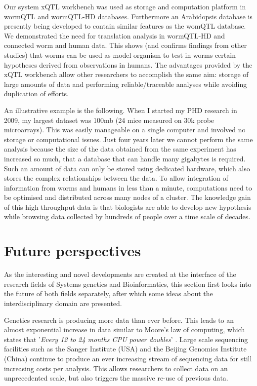 Our system xQTL workbench was used as storage and computation platform in wormQTL and wormQTL-HD databases. Furthermore an Arabidopsis database is 
presently being developed to contain similar features as the womQTL database. We demonstrated the need for translation analysis in wormQTL-HD and 
connected worm and human data. This shows (and confirms findings from other studies) that worms can be used as model organism to test in worms certain 
hypotheses derived from observations in humans. The advantages provided by the xQTL workbench allow other researchers to accomplish the same aim: 
storage of large amounts of data and performing reliable/traceable analyses while avoiding duplication of efforts.

An illustrative example is the following. When I started my PHD research in 2009, my largest dataset was 100mb (24 mice measured on 30k probe 
microarrays). This was easily manageable on a single computer and involved no storage or computational issues. Just four years later we cannot 
perform the same analysis because the size of the data obtained from the same experiment has increased so much, that a database that can handle 
many gigabytes is required. Such an amount of data can only be stored using dedicated hardware, which also stores the complex relationships 
between the data. To allow integration of information from worms and humans in less than a minute, computations need to be optimised and 
distributed across many nodes of a cluster. The knowledge gain of this high throughput data is that biologists are able to develop new 
hypothesis while browsing data collected by hundreds of people over a time scale of decades. 

\section{Future perspectives}
As the interesting and novel developments are created at the interface of the research fields of Systems genetics and Bioinformatics, this 
section first looks into the future of both fields separately, after which some ideas about the interdisciplinary domain are presented.  

Genetics research is producing more data than ever before. This leads to an almost exponential increase in data similar to Moore's law of 
computing, which states that '\emph{Every 12 to 24 months CPU power doubles}' \cite{Moore:1975, Moore:1998, Editorial:2009}. Large scale sequencing facilities such as the Sanger Institute (USA) and 
the Beijing Genomics Institute (China) continue to produce an ever increasing stream of sequencing data for still increasing costs per 
analysis. This allows researchers to collect data on an unprecedented scale, but also triggers the massive re-use of previous data.  


